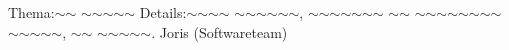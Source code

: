
%
{Thema:}{$\sim$$\sim$ $\sim$$\sim$$\sim$$\sim$$\sim$}%
{Details:}{$\sim$$\sim$$\sim$$\sim$ $\sim$$\sim$$\sim$$\sim$$\sim$$\sim$, $\sim$$\sim$$\sim$$\sim$$\sim$$\sim$$\sim$ $\sim$$\sim$ $\sim$$\sim$$\sim$$\sim$$\sim$$\sim$$\sim$$\sim$ $\sim$$\sim$$\sim$$\sim$$\sim$, $\sim$$\sim$ $\sim$$\sim$$\sim$$\sim$$\sim$.}
{Joris (Softwareteam)}